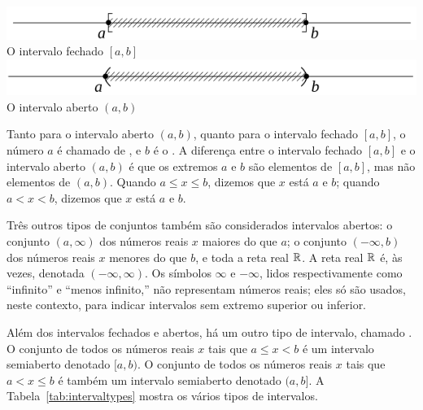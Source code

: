 {
	\includegraphics{closedinter}\\
	O intervalo fechado $[a,b]$\\[\baselineskip]
	\includegraphics{openinter}\\
	O intervalo aberto $(a,b)$
}

Tanto para o intervalo aberto $(a,b)$, quanto para o intervalo
fechado $[a,b]$, o número $a$ é chamado de
,
e $b$ é o . A diferença entre o
intervalo fechado $[a,b]$ e o intervalo aberto $(a,b)$ é que os extremos $a$
e $b$ são elementos de $[a,b]$, mas não elementos de $(a,b)$. Quando
$a \le x \le b$, dizemos que $x$ está  $a$ e $b$; quando
$a < x < b$, dizemos que $x$ está  $a$ e $b$.

Três outros tipos de conjuntos também são considerados intervalos
abertos: o conjunto $(a,\infty)$ dos números reais $x$ maiores do que $a$;
o conjunto $(-\infty,b)$ dos números reais $x$ menores do que $b$,
e toda a reta real $\mathbb{R}$. A reta real $\mathbb{R}$ é, às vezes, denotada
$(-\infty,\infty)$. Os símbolos $\infty$ e $-\infty$, lidos respectivamente
como ``infinito''  e ``menos infinito,'' não representam números reais; eles
só são usados, neste contexto, para indicar intervalos sem extremo
superior ou inferior.

Além dos intervalos fechados e abertos, há um outro tipo de intervalo,
chamado . O conjunto
de todos os números
reais $x$ tais que $a \le x < b$ é um intervalo semiaberto denotado
$[a,b)$. O conjunto de todos os números reais $x$ tais que $a < x \le b$
é também um intervalo semiaberto denotado $(a,b]$.
A Tabela~\ref{tab:intervaltypes} mostra os vários tipos de intervalos.


